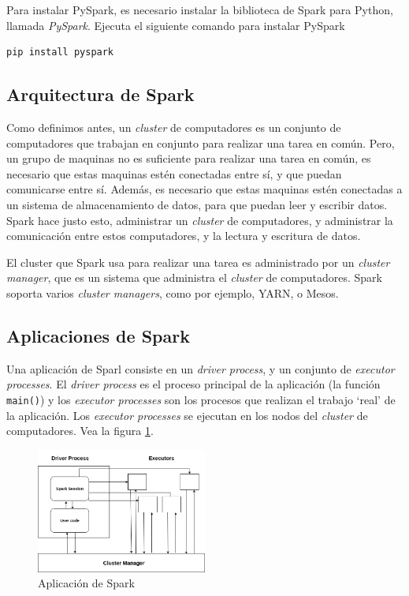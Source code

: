 \documentclass[11pt,oneside]{report}
\theoremstyle{plain}
\theoremstyle{definition}
\begin{document}
Para instalar PySpark, es necesario instalar la biblioteca de Spark para Python, llamada \emph{PySpark}. Ejecuta el siguiente comando para instalar PySpark

\begin{lstlisting}[language=bash]
    pip install pyspark
\end{lstlisting}

\subsection*{Arquitectura de Spark}

Como definimos antes, un \emph{cluster} de computadores es un conjunto de computadores que trabajan en conjunto para realizar una tarea en común. Pero, un grupo de maquinas no es suficiente para realizar una tarea en común, es necesario que estas maquinas estén conectadas entre sí, y que puedan comunicarse entre sí. Además, es necesario que estas maquinas estén conectadas a un sistema de almacenamiento de datos, para que puedan leer y escribir datos. Spark hace justo esto, administrar un \emph{cluster} de computadores, y administrar la comunicación entre estos computadores, y la lectura y escritura de datos.

El cluster que Spark usa para realizar una tarea es administrado por un \emph{cluster manager}, que es un sistema que administra el \emph{cluster} de computadores. Spark soporta varios \emph{cluster managers}, como por ejemplo, YARN, o Mesos.

\subsection*{Aplicaciones de Spark}

Una aplicación de Sparl consiste en un \emph{driver process}, y un conjunto de \emph{executor processes}. El \emph{driver process} es el proceso principal de la aplicación (la función \lstinline{main()}) y los \emph{executor processes} son los procesos que realizan el trabajo \enquote*{real} de la aplicación. Los \emph{executor processes} se ejecutan en los nodos del \emph{cluster} de computadores. Vea la figura \ref{fig:spark-app}.

\begin{figure}[h]
    \centering
    \includegraphics[width=0.5\textwidth]{cluster_spark.png}
    \caption{Aplicación de Spark}
    \label{fig:spark-app}
\end{figure}
\end{document}
